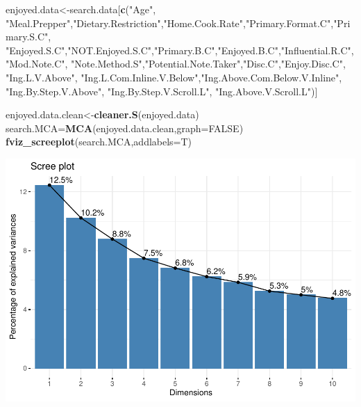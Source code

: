 \documentclass[
]{article}
\newenvironment{Shaded}{\begin{snugshade}}{\end{snugshade}}
\newcommand{\DataTypeTok}[1]{\textcolor[rgb]{0.13,0.29,0.53}{#1}}
\newcommand{\KeywordTok}[1]{\textcolor[rgb]{0.13,0.29,0.53}{\textbf{#1}}}
\newcommand{\NormalTok}[1]{#1}
\newcommand{\OtherTok}[1]{\textcolor[rgb]{0.56,0.35,0.01}{#1}}
\newcommand{\StringTok}[1]{\textcolor[rgb]{0.31,0.60,0.02}{#1}}
\begin{document}
\begin{Shaded}
\begin{Highlighting}[]
\NormalTok{enjoyed.data<-search.data[}\KeywordTok{c}\NormalTok{(}\StringTok{"Age"}\NormalTok{, }\StringTok{"Meal.Prepper"}\NormalTok{,}\StringTok{"Dietary.Restriction"}\NormalTok{,}\StringTok{"Home.Cook.Rate"}\NormalTok{,}\StringTok{"Primary.Format.C"}\NormalTok{,}\StringTok{"Primary.S.C"}\NormalTok{,}
            \StringTok{"Enjoyed.S.C"}\NormalTok{,}\StringTok{"NOT.Enjoyed.S.C"}\NormalTok{,}\StringTok{"Primary.B.C"}\NormalTok{,}\StringTok{"Enjoyed.B.C"}\NormalTok{,}\StringTok{"Influential.R.C"}\NormalTok{, }
            \StringTok{"Mod.Note.C"}\NormalTok{, }
            \StringTok{"Note.Method.S"}\NormalTok{,}\StringTok{"Potential.Note.Taker"}\NormalTok{,}\StringTok{"Disc.C"}\NormalTok{,}\StringTok{"Enjoy.Disc.C"}\NormalTok{, }\StringTok{"Ing.L.V.Above"}\NormalTok{,}
            \StringTok{"Ing.L.Com.Inline.V.Below"}\NormalTok{,}\StringTok{"Ing.Above.Com.Below.V.Inline"}\NormalTok{,  }\StringTok{"Ing.By.Step.V.Above"}\NormalTok{,  }\StringTok{"Ing.By.Step.V.Scroll.L"}\NormalTok{,}
            \StringTok{"Ing.Above.V.Scroll.L"}\NormalTok{)]}

\NormalTok{enjoyed.data.clean<-}\KeywordTok{cleaner.S}\NormalTok{(enjoyed.data)}
\NormalTok{search.MCA=}\KeywordTok{MCA}\NormalTok{(enjoyed.data.clean,}\DataTypeTok{graph=}\OtherTok{FALSE}\NormalTok{)}
\KeywordTok{fviz_screeplot}\NormalTok{(search.MCA,}\DataTypeTok{addlabels=}\NormalTok{T)}
\end{Highlighting}
\end{Shaded}

\includegraphics{Average-User-MCA_files/figure-latex/mca enjoyed all-1.pdf}
\end{document}
